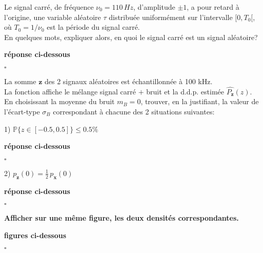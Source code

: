 \documentclass{article}
\newcommand{\debutrep}[1]{\color{blue}\begin{center} \hrulefill \textbf{ #1 } \hrulefill \end{center} }
\newcommand{\finrep}{\vspace*{5mm}\hfill $\square$\color{black}\vspace*{5mm}}
\begin{document}
Le signal carré, de fréquence $\nu_0=110\,Hz$, d'amplitude $\pm 1$, a pour  retard à l'origine, une variable aléatoire $\tau$ distribuée uniformément sur l'intervalle $[0,T_0[$, où $T_0=1/\nu_0$ est la période du signal carré. \\

En quelques mots, expliquer alors, en quoi le signal carré est un signal aléatoire? \\

\debutrep{réponse ci-dessous}

\finrep


La somme $\mathbf{z}$ des 2 signaux aléatoires est échantillonnée à 100 kHz. \\
La fonction affiche le mélange signal carré $+$ bruit et la d.d.p. estimée $\widehat{P_{\mathbf{z}}}(z)$.\\

En choisissant la moyenne du bruit $m_B=0$, trouver, en la justifiant, la valeur de l'écart-type $\sigma_B$ correspondant à chacune des 2 situations suivantes:
\begin{list}{}{\setlength{\leftmargin}{10mm} \setlength{\labelwidth}{20mm} \setlength{\labelsep}{3mm} \setlength{\itemsep}{1mm} }

\item[1)] $\mathbb{P} \{z \in [-0.5,0.5]\} \leq 0.5 \%$

\debutrep{réponse ci-dessous}

\finrep

\item[2)] ${\displaystyle p_{\mathbf{z}}(0) = \frac{1}{2} \, p_{\mathbf{x}}(0)}$

\debutrep{réponse ci-dessous}

\finrep

\end{list}

\textbf{Afficher sur une même figure, les deux densités correspondantes.}

\debutrep{figures ci-dessous}

\finrep
\end{document}
